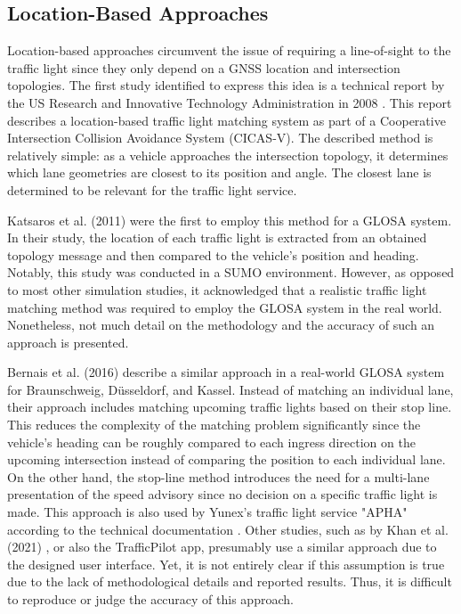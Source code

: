 \subsection{Location-Based Approaches}

Location-based approaches circumvent the issue of requiring a line-of-sight to the traffic light since they only depend on a GNSS location and intersection topologies. The first study identified to express this idea is a technical report by the US Research and Innovative Technology Administration in 2008 \cite{cicas-v}. This report describes a location-based traffic light matching system as part of a Cooperative Intersection Collision Avoidance System (CICAS-V). The described method is relatively simple: as a vehicle approaches the intersection topology, it determines which lane geometries are closest to its position and angle. The closest lane is determined to be relevant for the traffic light service.

Katsaros et al. (2011) \cite{katsaros_performance_2011} were the first to employ this method for a GLOSA system. In their study, the location of each traffic light is extracted from an obtained topology message and then compared to the vehicle's position and heading. Notably, this study was conducted in a SUMO environment. However, as opposed to most other simulation studies, it acknowledged that a realistic traffic light matching method was required to employ the GLOSA system in the real world. Nonetheless, not much detail on the methodology and the accuracy of such an approach is presented.

Bernais et al. (2016) \cite{bernais_design_2016} describe a similar approach in a real-world GLOSA system for Braunschweig, Düsseldorf, and Kassel. Instead of matching an individual lane, their approach includes matching upcoming traffic lights based on their stop line. This reduces the complexity of the matching problem significantly since the vehicle's heading can be roughly compared to each ingress direction on the upcoming intersection instead of comparing the position to each individual lane. On the other hand, the stop-line method introduces the need for a multi-lane presentation of the speed advisory since no decision on a specific traffic light is made. This approach is also used by Yunex's traffic light service "APHA" according to the technical documentation \cite{yunex_traffic_v2x-kommunikation_2023}. Other studies, such as by Khan et al. (2021) \cite{khan_eco-drive_2021}, or also the TrafficPilot app, presumably use a similar approach due to the designed user interface. Yet, it is not entirely clear if this assumption is true due to the lack of methodological details and reported results. Thus, it is difficult to reproduce or judge the accuracy of this approach.


